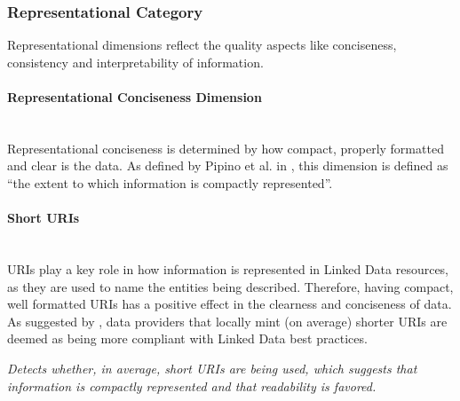 
\subsubsection{Representational Category}
\label{sec:Representational} 
Representational dimensions reflect the quality aspects like conciseness, consistency and interpretability of information.

\paragraph{Representational Conciseness Dimension}~\\ %
Representational conciseness is determined by how compact, properly formatted and clear is the data. As defined by Pipino et al. in \cite{Pipino2002}, this dimension is defined as ``the extent to which information is compactly represented''. 

\paragraph{Short URIs}~\\
URIs play a key role in how information is represented in Linked Data resources, as they are used to name the entities being described. Therefore, having compact, well formatted URIs has a positive effect in the clearness and conciseness of data. 
As suggested by \cite{Hogan2012:LDC}, data providers that locally mint (on average) shorter URIs are deemed as being more compliant with Linked Data best practices.

\begin{mdframed}[style=metricdefinition]
\emph{Detects whether, in average, short URIs are being used, which suggests that information is compactly represented and that readability is favored.}
\end{mdframed}

